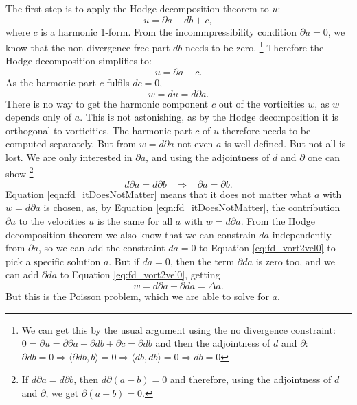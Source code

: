 The first step is to apply the Hodge decomposition theorem to $u$:
\[u = \partial a + db + c, \]
where $c$ is a harmonic 1-form. From the incommpressibility condition $\partial u = 0$, we know that the non divergence free part $db$ needs to be zero.\nobreak
%
\footnote{ We can get this by the usual argument using the no divergence constraint: $0 = \partial u = \partial \partial a + \partial db + \partial c = \partial d b$ and then the adjointness of $d$ and $\partial$: $\partial d b = 0 \Rightarrow \langle \partial d b , b \rangle = 0 \Rightarrow \langle db, db \rangle = 0 \Rightarrow db = 0 $}
%
Therefore the Hodge decomposition simplifies to: 
\[u = \partial a + c.\]
As the harmonic part $c$ fulfils $dc = 0$,
\begin{equation} w = du = d\partial a \label{eq:fd_vort2vel0}.\end{equation}
There is no way to get the harmonic component $c$ out of the vorticities $w$, as $w$ depends only of $a$. This is not astonishing, as by the Hodge decomposition it is orthogonal to vorticities. The harmonic part $c$ of $u$ therefore needs to be computed separately. But from $w = d \partial a$ not even $a$ is well defined. But not all is lost. We are only interested in $\partial a$, and using the adjointness of $d$ and $\partial$ one can show\nobreak 
%
\footnote{If $ d \partial a = d \partial b$, then $d \partial (a- b) = 0$ and therefore, using the adjointness of $d$ and $\partial$, we get $\partial (a-b) = 0.$}
%
\begin{equation}d \partial a = d \partial b \;\;\;\Rightarrow\;\;\; \partial a = \partial b \label{eqn:fd_itDoesNotMatter}.\end{equation}
%
Equation \ref{eqn:fd_itDoesNotMatter} means that it does not matter what $a$ with $w = d \partial a$ is chosen, as, by Equation \ref{eqn:fd_itDoesNotMatter}, the contribution $\partial a$ to the velocities $u$ is the same for all $a$ with $w = d \partial a$. From the Hodge decomposition theorem we also know that we can constrain $da$ independently from $\partial a$, so we can add the constraint $da = 0$ to Equation \ref{eq:fd_vort2vel0} to pick a specific solution $a$. But if $da = 0$, then the term $\partial d a$ is zero too, and we can add $\partial d a$ to Equation \ref{eq:fd_vort2vel0}, getting
\begin{equation} w = d\partial a + \partial d a = \Delta a .\label{eq:fd_vort2vel}\end{equation}
But this is the Poisson problem, which we are able to solve for $a$.


